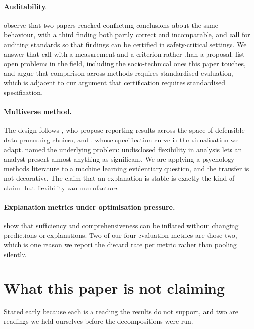 \documentclass[11pt]{article}
\begin{document}
\paragraph{Auditability.} \citet{lan2026} observe that two papers reached
conflicting conclusions about the same behaviour, with a third finding both partly
correct and incomparable, and call for auditing standards so that findings can be
certified in safety-critical settings. We answer that call with a measurement and
a criterion rather than a proposal. \citet{sharkey2025} list open problems in the
field, including the socio-technical ones this paper touches, and
\citet{mueller2025} argue that comparison across methods requires standardised
evaluation, which is adjacent to our argument that certification requires
standardised specification.

\paragraph{Multiverse method.} The design follows \citet{steegen2016}, who propose
reporting results across the space of defensible data-processing choices, and
\citet{simonsohn2020}, whose specification curve is the visualisation we adapt.
\citet{simmons2011} named the underlying problem: undisclosed flexibility in
analysis lets an analyst present almost anything as significant. We are applying a
psychology methods literature to a machine learning evidentiary question, and the
transfer is not decorative. The claim that an explanation is stable is exactly the
kind of claim that flexibility can manufacture.

\paragraph{Explanation metrics under optimisation pressure.}
\citet{hsia2023} show that sufficiency and comprehensiveness can be inflated
without changing predictions or explanations. Two of our four evaluation metrics
are those two, which is one reason we report the discard rate per metric rather
than pooling silently.

\section{What this paper is not claiming}

Stated early because each is a reading the results do not support, and two are
readings we held ourselves before the decompositions were run.
\end{document}
